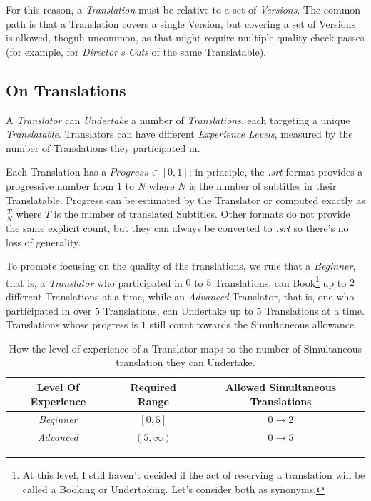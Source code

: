 \documentclass[12pt]{book}
\begin{document}
	For this reason, a \emph{Translation} must be relative to a set of \emph{Versions}. The common path is that a Translation covers a single Version, but covering a set of Versions is allowed, thoguh uncommon, as that might require multiple quality-check passes (for example, for \emph{Director's Cuts} of the same Translatable).
	
	\subsection{On Translations}
	A \emph{Translator} can \emph{Undertake} a number of \emph{Translations}, each targeting a unique \emph{Translatable}. Translators can have different \emph{Experience Levels}, measured by the number of Translations they participated in. 
	
	Each Translation has a $Progress \in [0,1]$; in principle, the \emph{.srt} format provides a progressive number from $1$ to $N$ where $N$ is the number of subtitles in their Translatable. Progress can be estimated by the Translator or computed exactly as $\frac{T}{N}$ where $T$ is the number of translated Subtitles. Other formats do not provide the same explicit count, but they can always be converted to \emph{.srt} so there's no loss of generality.
	
	To promote focusing on the quality of the translations, we rule that a \emph{Beginner}, that is, a \emph{Translator} who participated in $0$ to $5$ Translations, can Book\footnote{At this level, I still haven't decided if the act of reserving a translation will be called a Booking or Undertaking. Let's consider both as synonyms.} up to $2$ different Translations at a time, while an \emph{Advanced} Translator, that is, one who participated in over $5$ Translations, can Undertake up to $5$ Translations at a time. Translations whose progress is $1$ still count towards the Simultaneous allowance.
	
	\begin{table}[h]
		\centering
		\begin{tabular}{|c|c|c|}
			\hline
			\textbf{Level Of Experience} & \textbf{Required Range} & \textbf{Allowed Simultaneous  Translations}\\
			\hline
			\textit{Beginner} & $[0, 5]$ & $0\rightarrow2$ \\
			\textit{Advanced} & $(5, \infty)$ & $0\rightarrow5$ \\
			\hline
		\end{tabular}
		\caption{How the level of experience of a Translator maps to the number of Simultaneous translation they can Undertake.}
		\label{tab:experience-to-simultaneous-translations}
	\end{table}
	
\end{document}
